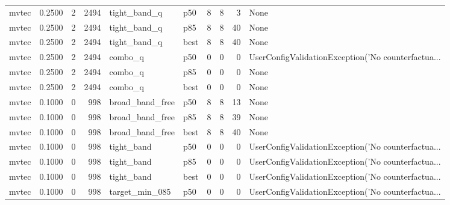 \begin{tabular}{lrrrllrrrl}
   mvtec &    0.2500 &    2 &   2494 &         tight\_band\_q &    p50 &               8 &          8 &       3 &                                               None \\
   mvtec &    0.2500 &    2 &   2494 &         tight\_band\_q &    p85 &               8 &          8 &      40 &                                               None \\
   mvtec &    0.2500 &    2 &   2494 &         tight\_band\_q &   best &               8 &          8 &      40 &                                               None \\
   mvtec &    0.2500 &    2 &   2494 &              combo\_q &    p50 &               0 &          0 &       0 & UserConfigValidationException('No counterfactua... \\
   mvtec &    0.2500 &    2 &   2494 &              combo\_q &    p85 &               0 &          0 &       0 &                                               None \\
   mvtec &    0.2500 &    2 &   2494 &              combo\_q &   best &               0 &          0 &       0 &                                               None \\
   mvtec &    0.1000 &    0 &    998 &      broad\_band\_free &    p50 &               8 &          8 &      13 &                                               None \\
   mvtec &    0.1000 &    0 &    998 &      broad\_band\_free &    p85 &               8 &          8 &      39 &                                               None \\
   mvtec &    0.1000 &    0 &    998 &      broad\_band\_free &   best &               8 &          8 &      40 &                                               None \\
   mvtec &    0.1000 &    0 &    998 &           tight\_band &    p50 &               0 &          0 &       0 & UserConfigValidationException('No counterfactua... \\
   mvtec &    0.1000 &    0 &    998 &           tight\_band &    p85 &               0 &          0 &       0 & UserConfigValidationException('No counterfactua... \\
   mvtec &    0.1000 &    0 &    998 &           tight\_band &   best &               0 &          0 &       0 & UserConfigValidationException('No counterfactua... \\
   mvtec &    0.1000 &    0 &    998 &       target\_min\_085 &    p50 &               0 &          0 &       0 & UserConfigValidationException('No counterfactua... \\

\end{tabular}
